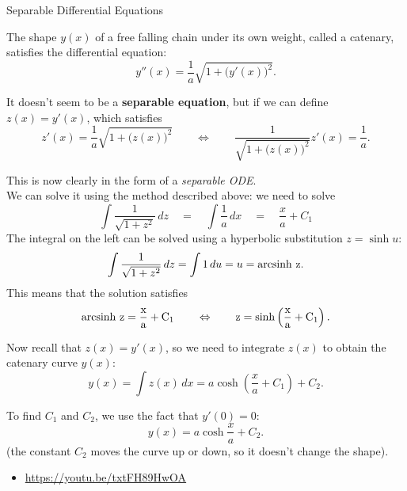 \begin{submodule}{Separable Differential Equations}
\def\arcsinh{\rm arcsinh\ }
\begin{example}
The shape $y(x)$ of a free falling chain under its own weight, called a catenary, satisfies the differential equation:
$$
y''(x) = \frac1a \sqrt{1+\big(y'(x)\big)^2}.
$$

It doesn't seem to be a \textbf{\color{Red!70!black}separable equation}, but if we can define $z(x) = y'(x)$, which satisfies
$$
z'(x) = \frac1a \sqrt{1+\big(z(x)\big)^2}
\qquad \Leftrightarrow \qquad \frac{1}{\sqrt{1+\big(z(x)\big)^2}} z'(x) = \frac1a.
$$

This is now clearly in the form of a \emph{\color{Red!70!black}separable ODE}. \\

We can solve it using the method described above: we need to solve
$$
\int \frac{1}{\sqrt{1+z^2}}\,dz \quad = \quad \int \frac1a \,dx \quad = \quad \frac{x}{a} + C_1
$$
The integral on the left can be solved using a hyperbolic substitution $z = \sinh u$:
$$
\int \frac{1}{\sqrt{1+z^2}}\,dz = \int 1 \, du = u = \arcsinh z.
$$
This means that the solution satisfies
$$
\arcsinh z = \frac{x}{a} + C_1 
\qquad \Leftrightarrow \qquad z = \sinh \left(\frac{x}{a} + C_1 \right).
$$

Now recall that $z(x) = y'(x)$, so we need to integrate $z(x)$ to obtain the catenary curve $y(x)$:
$$
y(x) = \int z(x) \, dx = a \cosh \left(\frac{x}{a} + C_1\right) + C_2.
$$

To find $C_1$ and $C_2$, we use the fact that $y'(0)=0$:
$$
y(x) = a \cosh \frac{x}{a}  + C_2.
$$
(the constant $C_2$ moves the curve up or down, so it doesn't change the shape).
\end{example}


\begin{video}
\begin{itemize}
	\item \href{https://youtu.be/txtFH89HwOA}{https://youtu.be/txtFH89HwOA} \hfill {}
\end{itemize}	
\end{video}

\end{submodule}

\hfill \\

